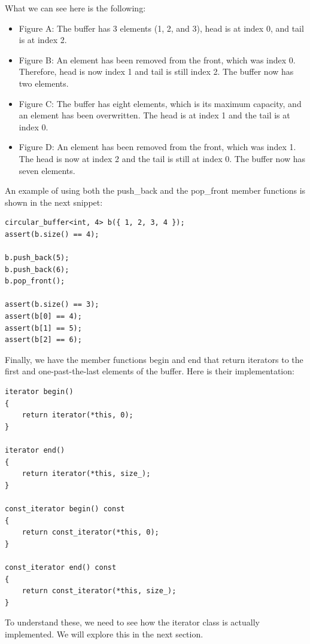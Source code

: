 What we can see here is the following:

\begin{itemize}
\item
Figure A: The buffer has 3 elements (1, 2, and 3), head is at index 0, and tail is at index 2.

\item
Figure B: An element has been removed from the front, which was index 0. Therefore, head is now index 1 and tail is still index 2. The buffer now has two elements.

\item
Figure C: The buffer has eight elements, which is its maximum capacity, and an element has been overwritten. The head is at index 1 and the tail is at index 0.

\item
Figure D: An element has been removed from the front, which was index 1. The head is now at index 2 and the tail is still at index 0. The buffer now has seven elements.
\end{itemize}

An example of using both the push\_back and the pop\_front member functions is shown in the next snippet:

\begin{lstlisting}[style=styleCXX]
circular_buffer<int, 4> b({ 1, 2, 3, 4 });
assert(b.size() == 4);

b.push_back(5);
b.push_back(6);
b.pop_front();

assert(b.size() == 3);
assert(b[0] == 4);
assert(b[1] == 5);
assert(b[2] == 6);
\end{lstlisting}

Finally, we have the member functions begin and end that return iterators to the first and one-past-the-last elements of the buffer. Here is their implementation:

\begin{lstlisting}[style=styleCXX]
iterator begin()
{
	return iterator(*this, 0);
}

iterator end()
{
	return iterator(*this, size_);
}

const_iterator begin() const
{
	return const_iterator(*this, 0);
}

const_iterator end() const
{
	return const_iterator(*this, size_);
}
\end{lstlisting}

To understand these, we need to see how the iterator class is actually implemented. We will explore this in the next section.

